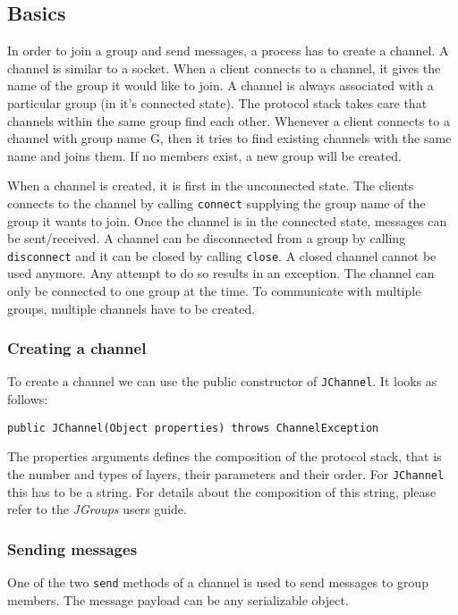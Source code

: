 \subsection{Basics}
In order to join a group and send messages, a process has to create a channel. A channel is similar to a socket. When a client connects to a channel, it gives the name of the group it would like to join. A channel is always associated with a particular group (in it's connected state). The protocol stack takes care that channels within the same group find each other. Whenever a client connects to a channel with group name G, then it tries to find existing channels with the same name and joins them. If no members exist, a new group will be created.

When a channel is created, it is first in the unconnected state. The clients connects to the channel by calling \texttt{connect} supplying the group name of the group it wants to join. Once the channel is in the connected state, messages can be sent/received. A channel can be disconnected from a group by calling \texttt{disconnect} and it can be closed by calling \texttt{close}. A closed channel cannot be used anymore. Any attempt to do so results in an exception. The channel can only be connected to one group at the time. To communicate with multiple groups, multiple channels have to be created.

\subsubsection{Creating a channel}
To create a channel we can use the public constructor of \texttt{JChannel}. It looks as follows:

\begin{verbatim}
public JChannel(Object properties) throws ChannelException
\end{verbatim}

The properties arguments defines the composition of the protocol stack, that is the number and types of layers, their parameters and their order. For \texttt{JChannel} this has to be a string. For details about the composition of this string, please refer to the \emph{JGroups} users guide.

\subsubsection{Sending messages}
One of the two \texttt{send} methods of a channel is used to send messages to group members. The message payload can be any serializable object.

